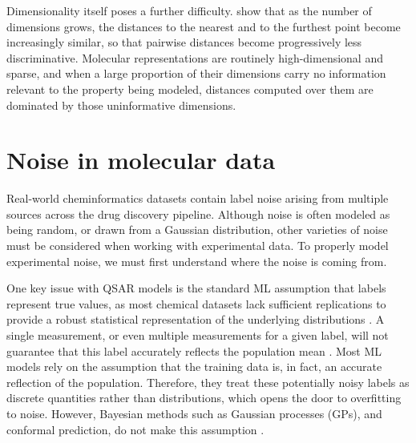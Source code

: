 Dimensionality itself poses a further difficulty. \citet{Beyer1999} show that as the number of dimensions grows, the distances to the nearest and to the furthest
point become increasingly similar, so that pairwise distances become progressively less discriminative. Molecular representations are routinely high-dimensional and sparse, and when a
large proportion of their dimensions carry no information relevant to the property being modeled, distances computed over them are dominated by those uninformative dimensions.


\section{Noise in molecular data}

Real-world cheminformatics datasets contain label noise arising from multiple sources across the drug discovery pipeline. Although noise is often modeled as being random, or drawn from a Gaussian distribution, other varieties of noise must be considered when working with experimental data. To properly model experimental noise, we must first understand where the noise is coming from.

One key issue with QSAR models is the standard ML assumption that labels represent true values, as most chemical datasets lack sufficient replications to provide a robust statistical representation of the underlying distributions \citep{Kolmar2021}. A single measurement, or even multiple measurements for a given label, will not guarantee that this label accurately reflects the population mean \citep{Kolmar2021}. Most ML models rely on the assumption that the training data is, in fact, an accurate reflection of the population. Therefore, they treat these potentially noisy labels as discrete quantities rather than distributions, which opens the door to overfitting to noise. However, Bayesian methods such as Gaussian processes (GPs), and conformal prediction, do not make this assumption \citep{Kolmar2021}.

